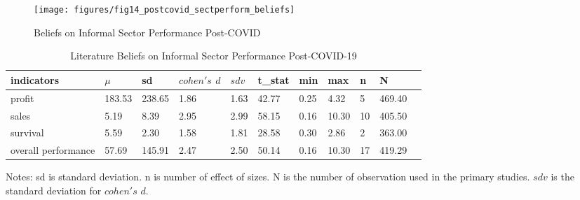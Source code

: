 \documentclass[a4paper, 12pt]{article}
\begin{document}
    \begin{figure}[H]
        \centering
        \texttt{[image: figures/fig14\_postcovid\_sectperform\_beliefs]}
        \caption{Beliefs on Informal Sector Performance Post-COVID}
        \label{fig9:beliefs-inf-sector-perform-postcovid}
    \end{figure}

    \begin{table}[H]
        \centering
        \caption{Literature Beliefs on Informal Sector Performance Post-COVID-19}
        \label{tab5:literature-beliefs-informal-postcovid}
        \begin{tabular}{lllllllllll}
            \toprule
            indicators          & $\mu$  & sd     & $cohen's$ $d$ & $sdv$ & t\_stat & min  & max   & n  & N      \\
            \midrule
            profit              & 183.53 & 238.65 & 1.86          & 1.63  & 42.77   & 0.25 & 4.32  & 5  & 469.40 \\
            sales               & 5.19   & 8.39   & 2.95          & 2.99  & 58.15   & 0.16 & 10.30 & 10 & 405.50 \\
            survival            & 5.59   & 2.30   & 1.58          & 1.81  & 28.58   & 0.30 & 2.86  & 2  & 363.00 \\
            overall performance & 57.69  & 145.91 & 2.47          & 2.50  & 50.14   & 0.16 & 10.30 & 17 & 419.29 \\
            \bottomrule
        \end{tabular}
        \begin{minipage}{17cm}
            \vspace{0.1cm}
            \small Notes: sd is standard deviation. n is number of effect of sizes. N is the number of observation used in the primary studies. $sdv$ is the standard deviation for $cohen's$ $d$.
        \end{minipage}
    \end{table}
\end{document}
